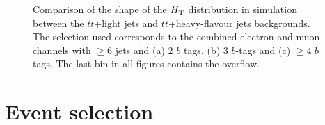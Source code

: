 \begin{figure}[h!tb]\begin{center}
	\caption{Comparison of the shape of the $\HT$ distribution in simulation between the $t\bar{t}$+light jets and $t\bar{t}$+heavy-flavour jets backgrounds.
The selection used corresponds to the combined electron and muon channels with $\geq 6$ jets and (a) 2 $b$ tags, 
(b) 3 $b$-tags and (c) $\geq 4$ $b$ tags. The last bin in all figures contains the overflow.\label{fig:HT_checks_ttjetsComp}}
\end{center}\end{figure}




\section{Event selection}\label{sec:htxEVT}

